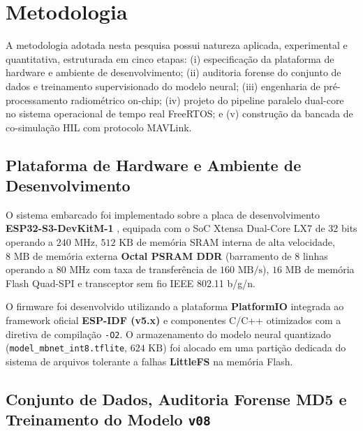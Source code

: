 \documentclass[12pt]{article}
\begin{document}
\section{Metodologia}

A metodologia adotada nesta pesquisa possui natureza aplicada, experimental e quantitativa, estruturada em cinco etapas: (i) especificação da plataforma de hardware e ambiente de desenvolvimento; (ii) auditoria forense do conjunto de dados e treinamento supervisionado do modelo neural; (iii) engenharia de pré-processamento radiométrico on-chip; (iv) projeto do pipeline paralelo dual-core no sistema operacional de tempo real FreeRTOS; e (v) construção da bancada de co-simulação HIL com protocolo MAVLink.

\subsection{Plataforma de Hardware e Ambiente de Desenvolvimento}

O sistema embarcado foi implementado sobre a placa de desenvolvimento \textbf{ESP32-S3-DevKitM-1} \parencite{esp32s3}, equipada com o SoC Xtensa Dual-Core LX7 de 32 bits operando a $240\text{ MHz}$, $512\text{ KB}$ de memória SRAM interna de alta velocidade, $8\text{ MB}$ de memória externa \textbf{Octal PSRAM DDR} (barramento de 8 linhas operando a $80\text{ MHz}$ com taxa de transferência de $160\text{ MB/s}$), $16\text{ MB}$ de memória Flash Quad-SPI e transceptor sem fio IEEE 802.11 b/g/n.

O firmware foi desenvolvido utilizando a plataforma \textbf{PlatformIO} \parencite{platformio2024} integrada ao framework oficial \textbf{ESP-IDF (v5.x)} e componentes C/C++ otimizados com a diretiva de compilação \texttt{-O2}. O armazenamento do modelo neural quantizado (\texttt{model\_mbnet\_int8.tflite}, $624\text{ KB}$) foi alocado em uma partição dedicada do sistema de arquivos tolerante a falhas \textbf{LittleFS} na memória Flash.

\subsection{Conjunto de Dados, Auditoria Forense MD5 e Treinamento do Modelo \texttt{v08}}
\end{document}

